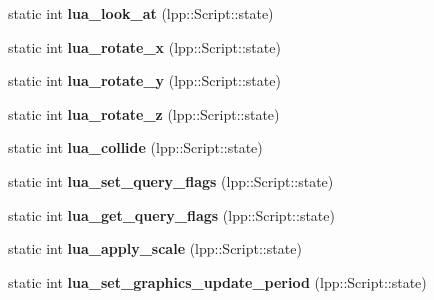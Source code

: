 \begin{DoxyCompactItemize}
\item 
static int {\bfseries lua\+\_\+look\+\_\+at} (lpp\+::\+Script\+::state)\hypertarget{class_lua_interface_ae0e5fc2143433b20576d0fc47279a359}{}\label{class_lua_interface_ae0e5fc2143433b20576d0fc47279a359}

\item 
static int {\bfseries lua\+\_\+rotate\+\_\+x} (lpp\+::\+Script\+::state)\hypertarget{class_lua_interface_ac8c9f911e8ddc4902ed3d41e2530c8da}{}\label{class_lua_interface_ac8c9f911e8ddc4902ed3d41e2530c8da}

\item 
static int {\bfseries lua\+\_\+rotate\+\_\+y} (lpp\+::\+Script\+::state)\hypertarget{class_lua_interface_abc3f532f0802ba656ece252e56142578}{}\label{class_lua_interface_abc3f532f0802ba656ece252e56142578}

\item 
static int {\bfseries lua\+\_\+rotate\+\_\+z} (lpp\+::\+Script\+::state)\hypertarget{class_lua_interface_ad00da18e4a3b7b98da92bcbc7527a5a9}{}\label{class_lua_interface_ad00da18e4a3b7b98da92bcbc7527a5a9}

\item 
static int {\bfseries lua\+\_\+collide} (lpp\+::\+Script\+::state)\hypertarget{class_lua_interface_acb350433726bf138654859e47ed0b61d}{}\label{class_lua_interface_acb350433726bf138654859e47ed0b61d}

\item 
static int {\bfseries lua\+\_\+set\+\_\+query\+\_\+flags} (lpp\+::\+Script\+::state)\hypertarget{class_lua_interface_ae89bb41fe0a89d1e982d738ca37d0e2f}{}\label{class_lua_interface_ae89bb41fe0a89d1e982d738ca37d0e2f}

\item 
static int {\bfseries lua\+\_\+get\+\_\+query\+\_\+flags} (lpp\+::\+Script\+::state)\hypertarget{class_lua_interface_a327bbe9908924a7ba9b52d8b3d8b4db9}{}\label{class_lua_interface_a327bbe9908924a7ba9b52d8b3d8b4db9}

\item 
static int {\bfseries lua\+\_\+apply\+\_\+scale} (lpp\+::\+Script\+::state)\hypertarget{class_lua_interface_a0076f346a0e9332c5dc3ddf51a2a4fb4}{}\label{class_lua_interface_a0076f346a0e9332c5dc3ddf51a2a4fb4}

\item 
static int {\bfseries lua\+\_\+set\+\_\+graphics\+\_\+update\+\_\+period} (lpp\+::\+Script\+::state)\hypertarget{class_lua_interface_a92b69210a24971e45ca568ece9acd97e}{}\label{class_lua_interface_a92b69210a24971e45ca568ece9acd97e}


\end{DoxyCompactItemize}

